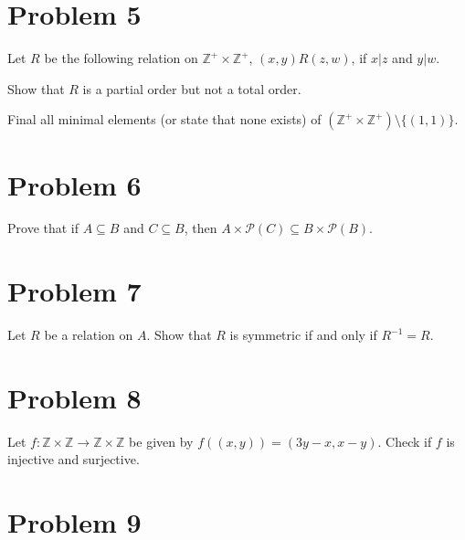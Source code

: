 \documentclass{article}
\begin{document}

    \section*{Problem 5}

    Let $R$ be the following relation on $\mathbb{Z}^+\times\mathbb{Z}^+$, $(x,y)R(z,w)$,
    if $x|z$ and $y|w$.

    Show that $R$ is a partial order but not a total order.

    Final all minimal elements (or state that none exists) of $(\mathbb{Z}^+\times\mathbb{Z}^+)
    \setminus \{(1,1)\}$.


    \section*{Problem 6}

    Prove that if $A\subseteq B$ and $C\subseteq B$, then $A\times\mathcal{P}(C)\subseteq B
    \times \mathcal{P}(B)$.


    \section*{Problem 7}

    Let $R$ be a relation on $A$. Show that $R$ is symmetric if and only if $R^{-1} = R$.


    \section*{Problem 8}
    
    Let $f:\mathbb{Z}\times\mathbb{Z}\rightarrow\mathbb{Z}\times\mathbb{Z}$ be given by 
    $f((x,y)) = (3y-x,x-y)$. Check if $f$ is injective and surjective.


    \section*{Problem 9}
\end{document}

